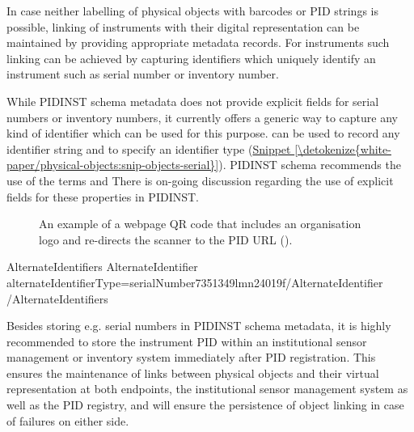 \documentclass[a4paper,10pt,english]{sphinxmanual}
\begin{document}
In case neither labelling of physical objects with barcodes or PID
strings is possible, linking of instruments with their digital
representation can be maintained by providing appropriate metadata
records. For instruments such linking can be achieved by capturing
identifiers which uniquely identify an instrument such as serial number
or inventory number.

While PIDINST schema metadata does not provide explicit fields for
serial numbers or inventory numbers, it currently offers a generic way
to capture any kind of identifier which can be used for this purpose.
 can be used to record any identifier string and
 to specify an identifier type
(\hyperref[\detokenize{white-paper/physical-objects:snip-objects-serial}]{Snippet \ref{\detokenize{white-paper/physical-objects:snip-objects-serial}}}). PIDINST schema recommends the use of
the terms  and  There is on-going
discussion regarding the use of explicit fields for these properties
in PIDINST.

\begin{figure}[htbp]
\centering
\capstart

\noindent{}
\caption{An example of a webpage QR code that includes an organisation logo
and re-directs the scanner to the PID URL
().}\label{\detokenize{white-paper/physical-objects:id2}}\label{\detokenize{white-paper/physical-objects:fig-objects-qr}}\end{figure}
\def\sphinxLiteralBlockLabel{\label{\detokenize{white-paper/physical-objects:id3}}\label{\detokenize{white-paper/physical-objects:snip-objects-serial}}}
\begin{sphinxVerbatim}[commandchars=\\\{\}]
  \PYGZlt{}AlternateIdentifiers\PYGZgt{}
     \PYGZlt{}AlternateIdentifier alternateIdentifierType=\PYGZdq{}serialNumber\PYGZdq{}\PYGZdq{}\PYGZgt{}7351\PYGZhy{}349l\PYGZhy{}mn24\PYGZhy{}019f\PYGZlt{}/AlternateIdentifier\PYGZgt{}
  \PYGZlt{}/AlternateIdentifiers\PYGZgt{}
\end{sphinxVerbatim}

Besides storing e.g. serial numbers in PIDINST schema metadata, it is
highly recommended to store the instrument PID within an institutional
sensor management or inventory system immediately after PID
registration. This ensures the maintenance of links between physical
objects and their virtual representation at both endpoints, the
institutional sensor management system as well as the PID registry, and
will ensure the persistence of object linking in case of failures on
either side.
\end{document}
